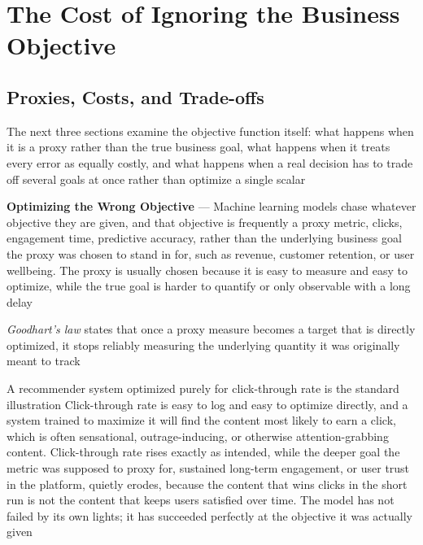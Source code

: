 \section{The Cost of Ignoring the Business Objective}
\label{chap:cost-ignoring-business-objective}

\subsection{Proxies, Costs, and Trade-offs}
\label{sec:proxies-costs-tradeoffs}

The next three sections examine the objective function itself: what happens when
it is a proxy rather than the true business goal, what happens when it treats
every error as equally costly, and what happens when a real decision has to trade
off several goals at once rather than optimize a single scalar

\textbf{Optimizing the Wrong Objective} --- Machine learning models chase whatever
objective they are given, and that objective is frequently a proxy metric, clicks,
engagement time, predictive accuracy, rather than the underlying business goal
the proxy was chosen to stand in for, such as revenue, customer retention, or user
wellbeing. The proxy is usually chosen because it is easy to measure and easy to
optimize, while the true goal is harder to quantify or only observable with a long
delay

\begin{definition}
  \emph{Goodhart's law} states that once a proxy measure becomes a target that
  is directly optimized, it stops reliably measuring the underlying quantity it was
  originally meant to track
\end{definition}

A recommender system optimized purely for click-through rate is the standard illustration
Click-through rate is easy to log and easy to optimize directly, and a system trained
to maximize it will find the content most likely to earn a click, which is often
sensational, outrage-inducing, or otherwise attention-grabbing content. Click-through
rate rises exactly as intended, while the deeper goal the metric was supposed to
proxy for, sustained long-term engagement, or user trust in the platform, quietly
erodes, because the content that wins clicks in the short run is not the content
that keeps users satisfied over time. The model has not failed by its own lights;
it has succeeded perfectly at the objective it was actually given


